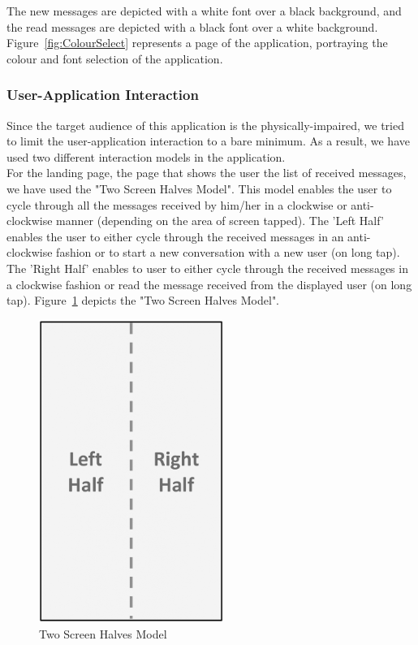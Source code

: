 \documentclass[14pt]{report}
\begin{document}
					The new messages are depicted with a white font over a black background, and the read messages are depicted with a black font over a white background. Figure~\ref{fig:ColourSelect} represents a page of the application, portraying the colour and font selection of the application.
				\subsubsection{User-Application Interaction}
					Since the target audience of this application is the physically-impaired, we tried to limit the user-application interaction to a bare minimum. As a result, we have used two different interaction models in the application.\\

					For the landing page, the page that shows the user the list of received messages, we have used the "Two Screen Halves Model". This model enables the user to cycle through all the messages received by him/her in a clockwise or anti-clockwise manner (depending on the area of screen tapped). The 'Left Half' enables the user to either cycle through the received messages in an anti-clockwise fashion or to start a new conversation with a new user (on long tap). The 'Right Half' enables to user to either cycle through the received messages in a clockwise fashion or read the message received from the displayed user (on long tap). Figure~\ref{fig:2half} depicts the "Two Screen Halves Model".\\
					\begin{figure}[h]
						\includegraphics[width=6cm]{2half.png}
						\centering
						\caption{Two Screen Halves Model}
						\label{fig:2half}
					\end{figure} 
\end{document}
